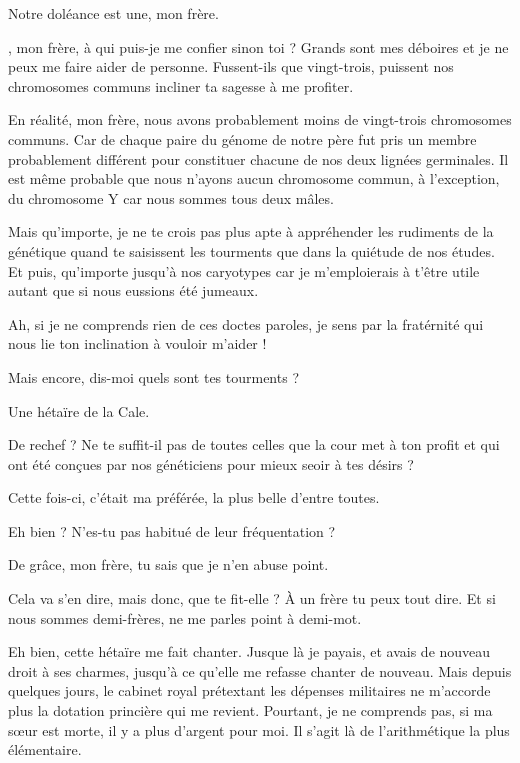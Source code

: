 
\begin{drama}
  \elenaspeaks Notre doléance est une, mon frère.

  \vladimirspeaks \elena, mon frère, à qui puis-je me confier sinon toi ? Grands sont mes déboires et je ne peux me faire aider de personne. Fussent-ils que vingt-trois, puissent nos chromosomes communs incliner ta sagesse à me profiter.

  \elenaspeaks En réalité, mon frère, nous avons probablement moins de vingt-trois chromosomes communs. Car de chaque paire du génome de notre père fut pris un membre probablement différent pour constituer chacune de nos deux lignées germinales. Il est même probable que nous n’ayons aucun chromosome commun, à l’exception, du chromosome Y car nous sommes tous deux mâles.

  Mais qu’importe, je ne te crois pas plus apte à appréhender les rudiments de la génétique quand te saisissent les tourments que dans la quiétude de nos études. Et puis, qu’importe jusqu’à nos caryotypes car je m’emploierais à t’être utile autant que si nous eussions été jumeaux.

  \vladimirspeaks Ah, si je ne comprends rien de ces doctes paroles, je sens par la fratérnité qui nous lie ton inclination à vouloir m’aider !

  \elenaspeaks Mais encore, dis-moi quels sont tes tourments ?

  \vladimirspeaks Une hétaïre de la Cale.

  \elenaspeaks De rechef ? Ne te suffit-il pas de toutes celles que la cour met à ton profit et qui ont été conçues par nos généticiens pour mieux seoir à tes désirs ?

  \vladimirspeaks Cette fois-ci, c’était ma préférée, la plus belle d’entre toutes.

  \elenaspeaks Eh bien ? N’es-tu pas habitué de leur fréquentation ?

  \vladimirspeaks De grâce, mon frère, tu sais que je n’en abuse point.

  \elenaspeaks Cela va s’en dire, mais donc, que te fit-elle ? À un frère tu peux tout dire. Et si nous sommes demi-frères, ne me parles point à demi-mot.

  \vladimirspeaks Eh bien, cette hétaïre me fait chanter. Jusque là je payais, et avais de nouveau droit à ses charmes, jusqu’à ce qu’elle me refasse chanter de nouveau. Mais depuis quelques jours, le cabinet royal prétextant les dépenses militaires ne m’accorde plus la dotation princière qui me revient. Pourtant, je ne comprends pas, si ma sœur est morte, il y a plus d’argent pour moi. Il s’agit là de l’arithmétique la plus élémentaire.


\end{drama}

